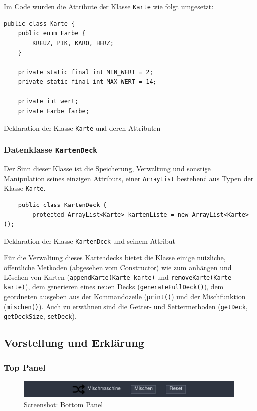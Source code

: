 \documentclass[a4paper,11pt]{article}
\begin{document}
Im Code wurden die Attribute der Klasse \texttt{Karte} wie folgt umgesetzt:

\begin{listing}[H]
\begin{verbatim}
public class Karte {
    public enum Farbe {
        KREUZ, PIK, KARO, HERZ;
    }

    private static final int MIN_WERT = 2;
    private static final int MAX_WERT = 14;

    private int wert;
    private Farbe farbe;
\end{verbatim}
\caption{Deklaration der Klasse \texttt{Karte} und deren Attributen}
\label{lst:karte}
\end{listing}


\subsubsection{Datenklasse \texttt{KartenDeck}}

Der Sinn dieser Klasse ist die Speicherung, Verwaltung und sonstige Manipulation seines einzigen Attributs, einer \texttt{ArrayList} bestehend aus Typen der Klasse \texttt{Karte}.

\begin{listing}[H]
    \begin{verbatim}
    public class KartenDeck {
        protected ArrayList<Karte> kartenListe = new ArrayList<Karte>();
    \end{verbatim}
    \caption{Deklaration der Klasse \texttt{KartenDeck} und seinem Attribut}
\end{listing}

Für die Verwaltung dieses Kartendecks bietet die Klasse einige nützliche, öffentliche Methoden (abgesehen vom Constructor) wie zum anhängen und Löschen von Karten (\texttt{appendKarte(Karte karte)} und \texttt{removeKarte(Karte karte)}), dem generieren eines neuen Decks (\texttt{generateFullDeck()}), dem geordneten ausgeben aus der Kommandozeile (\texttt{print()}) und der Mischfunktion (\texttt{mischen()}). Auch zu erwähnen sind die Getter- und Settermethoden (\texttt{getDeck}, \texttt{getDeckSize}, \texttt{setDeck}).


\subsection{Vorstellung und Erklärung}
\subsubsection{Top Panel}
\begin{figure}[H]
    \centering
    \includegraphics[width=.9\textwidth]{media/top-panel.jpg}
    \caption{Screenshot: Bottom Panel}
\end{figure}
\end{document}
